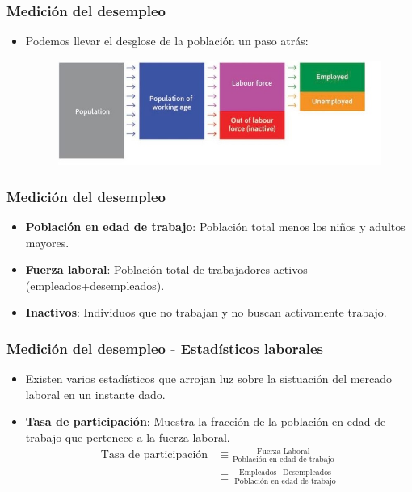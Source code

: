 \documentclass{beamer}
\begin{document}
\begin{frame}
\frametitle{Medici\'on del desempleo}
\begin{itemize}
\setlength\itemsep{1.0em}
\item Podemos llevar el desglose de la poblaci\'on un paso atr\'as:\\
\begin{center}
\begin{figure}
\includegraphics[scale=0.495]{Figuras/Desglose}
\end{figure}
\end{center}
\end{itemize}
\end{frame}

\begin{frame}
\frametitle{Medici\'on del desempleo}
\begin{itemize}
\setlength\itemsep{1.5em}
\item \textbf{Poblaci\'on en edad de trabajo}: Poblaci\'on total menos los ni\~nos y adultos mayores.
\item \textbf{Fuerza laboral}: Poblaci\'on total de trabajadores activos (empleados+desempleados).
\item \textbf{Inactivos}: Individuos que no trabajan y no buscan activamente trabajo.  
\end{itemize}
\end{frame}

\begin{frame}
\frametitle{Medici\'on del desempleo - Estad\'isticos laborales}
\begin{itemize}
\setlength\itemsep{1.4em}
\item Existen varios estad\'isticos que arrojan luz sobre la sistuaci\'on del mercado laboral en un instante dado.
\item \textbf{Tasa de participaci\'on}: Muestra la fracci\'on de la poblaci\'on en edad de trabajo que pertenece a la fuerza laboral. 
\small
\begin{equation*}
\begin{aligned}
\text{Tasa de participaci\'on} & \equiv \frac{\text{Fuerza Laboral}}{\text{Poblaci\'on en edad de trabajo}}\\ & \equiv \frac{\text{Empleados}+\text{Desempleados}}{\text{Poblaci\'on en edad de trabajo}}
\end{aligned}
\end{equation*}
\normalsize
\end{itemize}
\end{frame}
\end{document}
